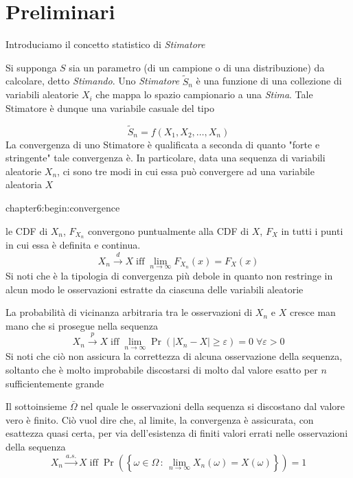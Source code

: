 \section{Preliminari}
Introduciamo il concetto statistico di \textit{Stimatore}
\begin{definitionS}
	Si supponga $S$ sia un parametro (di un campione o di una distribuzione) da calcolare, detto \textit{Stimando}. Uno \textit{Stimatore} 
	$\tilde{S}_n$ \`e una funzione di una collezione di variabili aleatorie $X_i$ che mappa lo spazio campionario a una \textit{Stima}. Tale Stimatore
	\`e dunque una variabile casuale del tipo
\end{definitionS}
\begin{equation}
	\tilde{S}_n = f(X_1,X_2,\ldots,X_n)
\end{equation}
La convergenza di uno Stimatore \`e qualificata a seconda di quanto "forte e stringente" tale convergenza \`e. In particolare, data una sequenza di 
variabili aleatorie $X_n$, ci sono tre modi in cui essa pu\`o convergere ad una variabile aleatoria $X$
\begin{altDescription}{chapter6:begin:convergence}
	\item[Convergenza in Distribuzione] le CDF di $X_n$, $F_{X_n}$ convergono puntualmente\footnotemark{} alla CDF di $X$, $F_X$ in tutti i punti in 
		cui essa \`e definita e continua.
		\begin{equation}
			X_n\stackrel{d}{\rightarrow}X\;\mathrm{iff}\;\lim_{n\to\infty}F_{X_n}(x)=F_X(x)
		\end{equation}
		Si noti che \`e la tipologia di convergenza pi\`u debole in quanto non restringe in alcun modo le osservazioni estratte da ciascuna delle 
		variabili aleatorie
	\item[Convergenza in Probabilit\`a] La probabilit\`a di vicinanza arbitraria tra le osservazioni di $X_n$ e $X$ cresce man mano che si prosegue
		nella sequenza
		\begin{equation}
			X_n\stackrel{p}{\rightarrow}X\;\mathrm{iff}\;\lim_{n\to\infty}\Pr(|X_n-X|\geq\varepsilon)=0\;\forall\varepsilon>0
		\end{equation}
		Si noti che ci\`o non assicura la correttezza di alcuna osservazione della sequenza, soltanto che \`e molto improbabile discostarsi di molto 
		dal valore esatto per $n$ sufficientemente grande
	\item[Convergenza Quasi Certa] Il sottoinsieme $\bar{\Omega}$ nel quale le osservazioni della sequenza si discostano dal valore vero \`e finito.
		Ci\`o vuol dire che, al limite, la convergenza \`e assicurata, con esattezza quasi certa, per via dell'esistenza di finiti valori errati nelle
		osservazioni della sequenza
		\begin{equation}
			X_n\stackrel{a.s.}{\rightarrow}X\;\mathrm{iff}\;\Pr\left(\left\{\omega\in\Omega\,:\,\lim_{n\to\infty}X_n(\omega)=X(\omega)\right\}\right)=1	
		\end{equation}
\end{altDescription}
